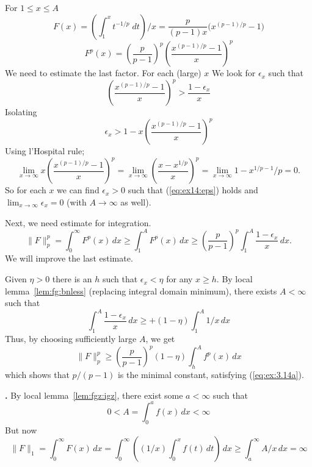 \begin{enumerate}
For \(1\leq x \leq A\)
\begin{equation*}
F(x)
 = \left(\int_1^x t^{-1/p}\;dt\right)/x
 = \frac{p}{(p-1)x}\bigl(x^{(p-1)/p} - 1\bigr)
\end{equation*}
\begin{equation*}
F^p(x)
 = \left(\frac{p}{p-1}\right)^p \left(\frac{x^{(p-1)/p} - 1}{x}\right)^p
\end{equation*}
We need to estimate the last factor.
For each (large) $x$ We look for \(\epsilon_x\) such that
\begin{equation} \label{eq:ex14:eps}
 \left(\frac{x^{(p-1)/p} - 1}{x}\right)^p > \frac{1-\epsilon_x}{x}
\end{equation}
Isolating
\begin{equation*}
\epsilon_x > 1 - x\left(\frac{x^{(p-1)/p} - 1}{x}\right)^p
\end{equation*}
Using l'Hospital rule;
\begin{equation*}
\lim_{x\to\infty} x\left(\frac{x^{(p-1)/p} - 1}{x}\right)^p
= \lim_{x\to\infty} \left(\frac{x - x^{1/p}}{x}\right)^p
= \lim_{x\to\infty} 1 - x^{1/p-1}/p = 0.
\end{equation*}
So for each $x$ %
we can find \(\epsilon_x>0\) such that (\ref{eq:ex14:eps}) holds
and \(\lim_{x\to\infty}\epsilon_x = 0\) (with \(A\to\infty\) as well).

Next, we need estimate for integration.
\begin{equation*}
\|F\|_p^p
= \int_0^\infty F^p(x)\,dx
\geq \int_1^A F^p(x)\,dx
\geq \left(\frac{p}{p-1}\right)^p \int_1^A \frac{1-\epsilon_x}{x}\,dx.
\end{equation*}
We will improve the last estimate.

Given \(\eta > 0\)
there is an $h$ such
that \(\epsilon_x < \eta\) for any \(x \geq h\).
By local lemma~\ref{lem:fg:bnless}
(replacing integral domain minimum), there exists \(A<\infty\) such that
\begin{equation*}
   \int_1^A \frac{1-\epsilon_x}{x}\,dx \geq + (1 - \eta) \int_1^A 1/x\,dx
\end{equation*}
Thus, by choosing sufficiently large $A$, we get
\begin{equation*}
\|F\|_p^p
\geq \left(\frac{p}{p-1}\right)^p (1 - \eta) \int_h^A f^p(x)\,dx
\end{equation*}
which shows that \(p/(p-1)\) is the minimal constant,
satisfying (\ref{eq:ex:3.14a}).

\textbf{.}
By local lemma~\ref{lem:fgz:igz}, there exist some \(a<\infty\)
such that
\begin{equation*}
0 < A = \int_0^a f(x)\,dx < \infty
\end{equation*}
But now
\begin{equation*}
\|F\|_1
= \int_0^\infty F(x)\,dx
= \int_0^\infty \left((1/x)\int_0^x f(t)\,dt\right)\,dx
\geq \int_a^\infty A/x\,dx = \infty
\end{equation*}



\end{enumerate}
